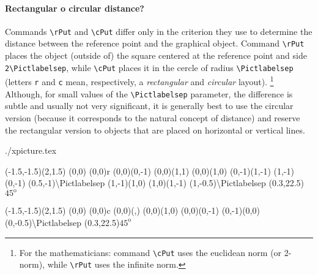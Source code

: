 \documentclass{article}
\newcommand{\TTT}{\texttt}
\newcommand{\cs}[1]{\mbox{\textnormal{\TTT{\textbackslash #1}}}}
\newcounter{exem}\stepcounter{exem}
\newenvironment{Exemple}{%
   \VerbatimEnvironment\begin{VerbatimOut}{./xpicture\theexem.tex}}{%
   \end{VerbatimOut}
   \par\noindent
   \marginpar{\fbox{Ex. \theexem}}\fbox{\begin{minipage}{\linewidth}
      \begin{minipage}{\linewidth}
         \setlength{\parindent}{2ex}
         \bigskip\par
         \catcode`\%=14
         
      \end{minipage}\medskip\par
      \hspace*{0.125\linewidth}\rule{0.75\linewidth}{0.4pt}\par\medskip
      \small
      \VerbatimInput{./xpicture\theexem.tex}
   \end{minipage}}\stepcounter{exem}\par\bigskip\noindent}
\begin{document}
\paragraph{Rectangular o circular distance?}
Commands \cs{rPut} and \cs{cPut} differ only in the criterion they use
to determine the distance between the reference point and the graphical object.
Command \cs{rPut} places the object (outside of) 
the square centered at the reference point and side \verb+2\Pictlabelsep+, 
while \cs{cPut} places it in the cercle of radius \verb+\Pictlabelsep+
(letters \verb+r+ and \verb+c+ mean, respectively,
a \emph{rectangular} and \emph{circular} layout).%
\footnote{For the mathematicians: command \cs{cPut} uses the euclidean norm 
(or 2-norm), while \cs{rPut} uses the infinite norm.}
Although, for small values of the \cs{Pictlabelsep} parameter,
the difference is subtle and usually not very significant, it is generally best
to use the circular version (because it corresponds to the natural concept of 
distance) and reserve the rectangular version
to objects that are placed on horizontal or vertical lines.
\begin{Exemple}
\begin{center}
\setlength{\unitlength}{1.5cm}
\renewcommand{\Pictlabelsep}{1}

\begin{Picture}(-1.5,-1.5)(2,1.5)
\Put(0,0){}
(0,0){r}
\xLINE(0,0)(0,-1)
\thicklines
\renewcommand{\Pictlabelsep}{0.1}
\xLINE(0,0)(1,1)
\xLINE(0,0)(1,0)
\xtrivVECTOR(0,-1)(1,-1)
\xtrivVECTOR(1,-1)(0,-1)
(0.5,-1){\footnotesize\textbackslash Pictlabelsep}
\xtrivVECTOR(1,-1)(1,0)
\xtrivVECTOR(1,0)(1,-1)
(1,-0.5){\footnotesize\textbackslash Pictlabelsep}
\polarreference\degreesangles
{}
\degreesangles
\Put[22.5](0.3,22.5){$45^{\mathrm o}$}
\end{Picture}
\begin{Picture}(-1.5,-1.5)(2,1.5)
\Put(0,0){}
(0,0){c}
\thicklines
\xLINE(0,0)(\numberCOSXLV,\numberCOSXLV)
\xLINE(0,0)(1,0)
\xtrivVECTOR(0,0)(0,-1)
\xtrivVECTOR(0,-1)(0,0)
\renewcommand{\Pictlabelsep}{0.1}
(0,-0.5){\footnotesize\textbackslash Pictlabelsep}
\polarreference\degreesangles
{}
\degreesangles
\Put[22.5](0.3,22.5){$45^{\mathrm o}$}
\end{Picture}
\end{center}
\end{Exemple}
\end{document}
